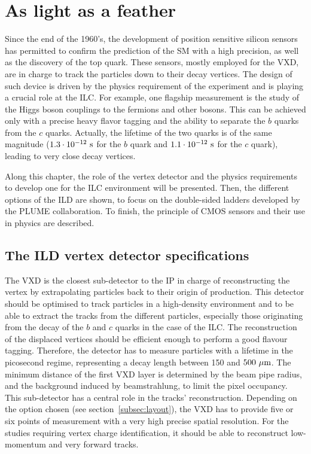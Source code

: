 \chapter{As light as a feather}
\label{chap:vxd}
  
  Since the end of the 1960's, the development of position sensitive silicon sensors has permitted to confirm the prediction of the \acrfull{SM} with a high precision, as well as the discovery of the top quark.
  These sensors, mostly employed for the \acrfull{VXD}, are in charge to track the particles down to their decay vertices.
  The design of such device is driven by the physics requirement of the experiment and is playing a crucial role at the \acrfull{ILC}.
  For example, one flagship measurement is the study of the Higgs boson couplings to the fermions and other bosons.
  This can be achieved only with a precise heavy flavor tagging and the ability to separate the $b$ quarks from the $c$ quarks. 
  Actually, the lifetime of the two quarks is of the same magnitude ($1.3 \cdot 10^{-12}~\rm{s}$ for the $b$ quark and $1.1 \cdot 10^{-12}~\rm{s}$ for the $c$ quark), leading to very close decay vertices. 
  
  Along this chapter, the role of the vertex detector and the physics requirements to develop one for the \gls{ILC} environment will be presented.
  Then, the different options of the \acrfull{ILD} are shown, to focus on the double-sided ladders developed by the \gls{PLUME} collaboration.
  To finish, the principle of \gls{CMOS} sensors and their use in physics are described.

  \minitoc
  
  \section{The ILD vertex detector specifications}
   
    The \gls{VXD} is the closest sub-detector to the \acrfull{IP} in charge of reconstructing the vertex by extrapolating particles back to their origin of production. 
    This detector should be optimised to track particles in a high-density environment and to be able to extract the tracks from the different particles, especially those originating from the decay of the $b$ and $c$ quarks in the case of the \gls{ILC}.
    The reconstruction of the displaced vertices should be efficient enough to perform a good flavour tagging.
    Therefore, the detector has to measure particles with a lifetime in the picosecond regime, representing a decay length between 150 and $500~\rm{\mu m}$.
    The minimum distance of the first \gls{VXD} layer is determined by the beam pipe radius, and the background induced by beamstrahlung, to limit the pixel occupancy.
    This sub-detector has a central role in the tracks' reconstruction.
    Depending on the option chosen (see section~\ref{subsec:layout}), the \gls{VXD} has to provide five or six points of measurement with a very high precise spatial resolution.
    For the studies requiring vertex charge identification, it should be able to reconstruct low-momentum and very forward tracks.

